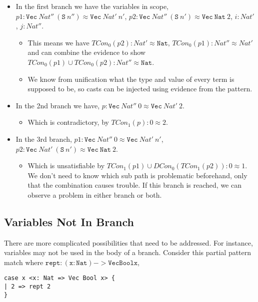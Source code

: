 \begin{itemize}
\item
In the first branch we have the variables in scope, $p1:\mathtt{Vec}\ Nat''\ (\mathtt{S}\ n'')\approx\mathtt{Vec}\ Nat'\ n'$, $p2:\mathtt{Vec}\ Nat''\ (\mathtt{S}\ n')\approx\mathtt{Vec}\ \mathtt{Nat}\ 2$, $i:Nat'$, $j:Nat''$.
\begin{itemize}
\item
This means we have $TCon_0(p2):Nat'\approx\mathtt{Nat}$, $TCon_0(p1):Nat''\approx Nat'$ and can combine the evidence to show $TCon_0(p1) \cup TCon_0(p2):Nat''\approx\mathtt{Nat}$.
\item
We know from unification what the type and value of every term is supposed to be, so casts can be injected using evidence from the pattern.
\end{itemize}
\item
In the 2nd branch we have, $p:\mathtt{Vec}\ Nat''\ 0\approx\mathtt{Vec}\ Nat'\ 2$.
\begin{itemize}
\item
Which is contradictory, by $TCon_1(p):0\approx2$.
\end{itemize}
\item
{}
In the 3rd branch, $p1:\mathtt{Vec}\ Nat''\ 0\approx\mathtt{Vec}\ Nat'\ n'$, $p2:\mathtt{Vec}\ Nat'\ (\mathtt{S}\ n')\approx\mathtt{Vec}\ \mathtt{Nat}\ 2$.
\begin{itemize}
\item
Which is unsatisfiable by $TCon_1(p1) \cup DCon_0(TCon_1(p2)):0\approx1$.
We don't need to know which sub path is problematic beforehand, only that the combination causes trouble.
If this branch is reached, we can observe a problem in either branch or both.
\end{itemize}
\end{itemize}
 
\subsection{Variables Not In Branch}
There are more complicated possibilities that need to be addressed.
For instance, variables may not be used in the body of a branch.
Consider this partial pattern match where $\mathtt{rept: (x: Nat) -> Vec Bool x}$,
 
\begin{lstlisting}[basicstyle={\ttfamily\small}]
case x <x: Nat => Vec Bool x> {
| 2 => rept 2
}
\end{lstlisting}
 
